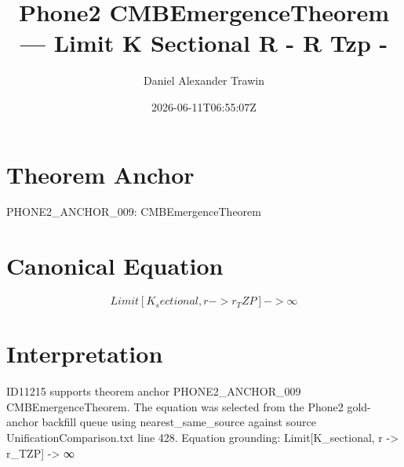 \documentclass[11pt]{article}
\title{Phone2 CMBEmergenceTheorem — Limit K Sectional R - R Tzp -}
\author{Daniel Alexander Trawin}
\date{2026-06-11T06:55:07Z}
\begin{document}
\maketitle
\section*{Theorem Anchor}
PHONE2_ANCHOR_009: CMBEmergenceTheorem
\section*{Canonical Equation}
\[
Limit[K_sectional, r -> r_TZP] -> ∞
\]
\section*{Interpretation}
ID11215 supports theorem anchor PHONE2_ANCHOR_009 CMBEmergenceTheorem. The equation was selected from the Phone2 gold-anchor backfill queue using nearest_same_source against source UnificationComparison.txt line 428. Equation grounding: Limit[K_sectional, r -> r_TZP] -> ∞
\end{document}
